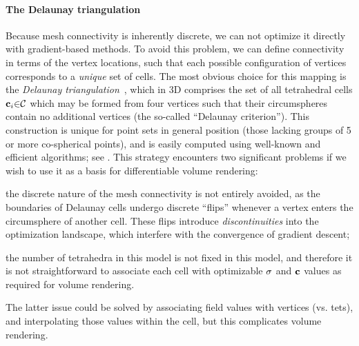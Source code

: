 \paragraph{The Delaunay triangulation}
%
Because mesh connectivity is inherently discrete, we can not optimize it directly with gradient-based methods.
To avoid this problem, we can define connectivity in terms of the vertex locations, such that each possible configuration of vertices corresponds to a \textit{unique} set of cells.
The most obvious choice for this mapping is the \emph{Delaunay triangulation}~\cite{delaunay}, which in 3D comprises the set of all tetrahedral cells $\mathbf{c}_i {\in} \mathcal{C}$ which may be formed from four vertices such that their circumspheres contain no additional vertices (the so-called ``Delaunay criterion'').
% 
This construction is unique for point sets in general position (those lacking groups of 5 or more co-spherical points), and is easily computed using well-known and efficient algorithms; see .
% 
This strategy encounters two significant problems if we wish to use it as a basis for differentiable volume rendering:
\begin{enumerate*} [label=(\arabic*)]
\item the discrete nature of the mesh connectivity is not entirely avoided, as the boundaries of Delaunay cells undergo discrete ``flips'' whenever a vertex enters the circumsphere of another cell.
These flips introduce \textit{discontinuities} into the optimization landscape, which interfere with the convergence of gradient descent; 
\item the number of tetrahedra in this model is not fixed in this model, and therefore it is not straightforward to associate each cell with optimizable $\sigma$ and $\mathbf{c}$ values as required for volume rendering.
\end{enumerate*}
% 
The latter issue could be solved by associating field values with vertices (vs. tets), and interpolating those values within the cell, but this complicates volume rendering.


